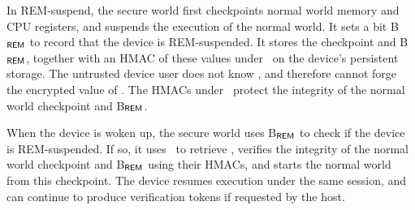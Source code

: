 In REM-suspend, the secure world first checkpoints normal world memory and CPU
registers, and suspends the execution of the normal world. It sets a bit
\textsf{B$_{\sf REM}$} to record that the device is REM-suspended. It stores
the checkpoint and \textsf{B$_{\sf REM}$}, together with an HMAC of these
values under \ks\ on the device's persistent storage.  The untrusted device
user does not know \kdev, and therefore cannot forge the encrypted value of
\ks. The HMACs under \ks\ protect the integrity of the normal world checkpoint
and \textsf{B$_{\sf REM}$}.

When the device is woken up, the secure world uses \textsf{B$_{\sf REM}$} to
check if the device is REM-suspended. If so, it uses \kdev\ to retrieve \ks,
verifies the integrity of the normal world checkpoint and \textsf{B$_{\sf
REM}$} using their HMACs, and starts the normal world from this checkpoint.
The device resumes execution under the same session, and can continue to
produce verification tokens if requested by the host.
